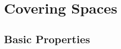 \documentclass[../../solutions.tex]{subfiles}
\begin{document}
\section{Covering Spaces}
\subsection{Basic Properties}
\begin{exercise} \leavevmode

\end{exercise}

\begin{exercise} \leavevmode

\end{exercise}

\begin{exercise} \leavevmode

\end{exercise}

\begin{exercise} \leavevmode

\end{exercise}

\begin{exercise} \leavevmode

\end{exercise}

\begin{exercise} \leavevmode

\end{exercise}

\begin{exercise} \leavevmode

\end{exercise}

\begin{exercise} \leavevmode

\end{exercise}

\begin{exercise} \leavevmode

\end{exercise}

\begin{exercise} \leavevmode

\end{exercise}

\begin{exercise} \leavevmode

\end{exercise}
\end{document}
